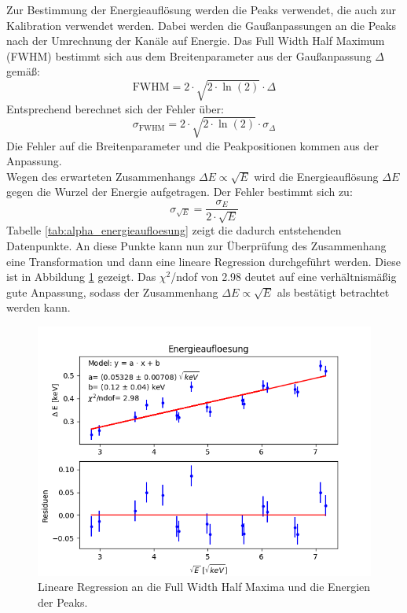 \documentclass[12pt,a4paper]{article}
\begin{document}
Zur Bestimmung der Energieauflösung werden die Peaks verwendet, die auch zur Kalibration verwendet werden. Dabei werden die Gaußanpassungen an die Peaks nach der Umrechnung der Kanäle auf Energie. Das Full Width Half Maximum (FWHM) bestimmt sich aus dem Breitenparameter aus der Gaußanpassung $\Delta$ gemäß:
\begin{equation*}
\textrm{FWHM} = 2 \cdot \sqrt{2 \cdot \ln(2)} \cdot \Delta
\end{equation*}
Entsprechend berechnet sich der Fehler über:
\begin{equation*}
\sigma _\textrm{FWHM} = 2 \cdot \sqrt{2 \cdot \ln(2)} \cdot \sigma _\Delta
\end{equation*}
Die Fehler auf die Breitenparameter und die Peakpositionen kommen aus der Anpassung. \\
Wegen des erwarteten Zusammenhangs $\Delta E \propto \sqrt{E}$ wird die Energieauflösung $\Delta E$ gegen die Wurzel der Energie aufgetragen. Der Fehler bestimmt sich zu:
\begin{equation*}
\sigma _{\sqrt{E}} = \dfrac{\sigma _E}{2 \cdot \sqrt{E}}
\end{equation*}
Tabelle \ref{tab:alpha_energieaufloesung} zeigt die dadurch entstehenden Datenpunkte. An diese Punkte kann nun zur Überprüfung des Zusammenhang eine Transformation und dann eine lineare Regression durchgeführt werden. Diese ist in Abbildung \ref{fig:alpha_energieaufloesung} gezeigt. Das $\chi ^2$/ndof von 2.98 deutet auf eine verhältnismäßig gute Anpassung, sodass der Zusammenhang $\Delta E \propto \sqrt{E}$ als bestätigt betrachtet werden kann.

\begin{figure}
\centering
\includegraphics[scale=0.8]{Bilder/Energieaufloesung/alpha_gesamt.png}
\caption{Lineare Regression an die Full Width Half Maxima und die Energien der Peaks.}
\label{fig:alpha_energieaufloesung}
\end{figure}
\end{document}
